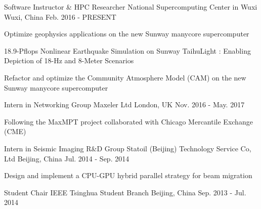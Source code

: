 \documentclass[11pt, a4paper]{awesome-cv}
\begin{document}
\begin{cventries}
    
  \cventry
    {Software Instructor \& HPC Researcher} %
    {National Supercomputing Center in Wuxi} %
    {Wuxi, China} %
    {Feb. 2016 - PRESENT} %
    {
      \begin{cvitems} %
        \item {Optimize geophysics applications on the new Sunway manycore supercomputer}
        \item {18.9-Pflops Nonlinear Earthquake Simulation on Sunway TaihuLight : Enabling Depiction of 18-Hz and 8-Meter Scenarios}
        \item {Refactor and optimize the Community Atmosphere Model (CAM) on the new Sunway manycore supercomputer}
      \end{cvitems}
    }
    
  \cventry
    {Intern in Networking Group} %
    {Maxeler Ltd} %
    {London, UK} %
    {Nov. 2016 - May. 2017} %
    {
      \begin{cvitems} %
        \item {Following the MaxMPT project collaborated with Chicago Mercantile Exchange (CME)}
      \end{cvitems}
    }


  \cventry
    {Intern in Seismic Imaging R\&D Group} %
    {Statoil (Beijing) Technology Service Co, Ltd} %
    {Beijing, China} %
    {Jul. 2014 - Sep. 2014} %
    {
      \begin{cvitems} %
        \item {Design and implement a CPU-GPU hybrid parallel strategy for beam migration}
      \end{cvitems}
    }

  \cventry
    {Student Chair} %
    {IEEE Tsinghua Student Branch} %
    {Beijing, China} %
    {Sep. 2013 - Jul. 2014} %
    {
    }

\end{cventries}
\end{document}
